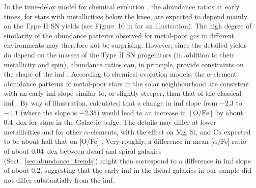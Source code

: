 \documentclass{aa}
\begin{document}
In the time-delay model for chemical evolution \citep{Tinsley1979,Matteucci1986}, the abundance ratios at early times, for stars with metallicities below the knee, are expected to depend mainly on the Type II SN yields (see Figure~10 in \citealt{Vincenzo2015} for an illustration). The high degree of similarity of the abundance patterns observed for metal-poor \acp{gc} in different environments may therefore not be surprising. However, since the detailed yields do depend on the masses of the Type II SN progenitors (in addition to their metallicity and spin), abundance ratios can, in principle, provide constraints on the shape of the \ac{imf} \citep{Matteucci1990,Nissen1994,McWilliam1997,Wyse1998,Tolstoy2003}.  According to chemical evolution models, the $\alpha$-element abundance patterns of metal-poor stars in the solar neighbourhood are consistent with an early \ac{imf} slope similar to, or slightly steeper, than that of the classical \citet{Salpeter1955} \ac{imf} \citep{Tsujimoto1997,Wyse1998,Hopkins2018}. By way of illustration, \citet{Wyse1992} calculated that a change in \ac{imf} slope from $-2.3$ to $-1.1$ (where the \citet{Salpeter1955} slope is $-2.35$) would lead to an increase in $\mathrm{[O/Fe]}$ by about 0.4~dex for stars in the Galactic bulge. The details may differ at lower metallicities and for other $\alpha$-elements, with the effect on Mg, Si, and Ca expected to be about half that on [O/Fe] \citep{Vincenzo2015}. Very roughly, a difference in mean [$\alpha$/Fe] ratio of about 0.04~dex between dwarf and spiral galaxies (Sect.~\ref{sec:abundance_trends}) might then correspond to a difference in \ac{imf} slope of about 0.2, suggesting that the early \ac{imf} in the dwarf galaxies in our sample did not differ substantially from the \citet{Salpeter1955} \ac{imf}.
\end{document}
